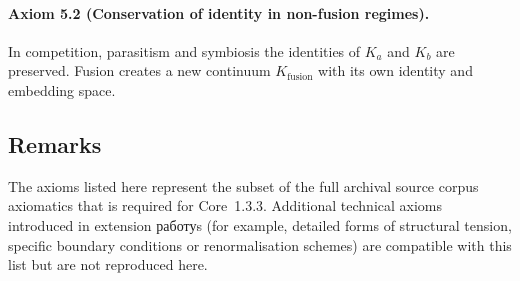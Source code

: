 \paragraph{Axiom 5.2 (Conservation of identity in non-fusion regimes).}
In competition, parasitism and symbiosis the identities of \(K_a\) and \(K_b\)
are preserved.  Fusion creates a new continuum \(K_{\mathrm{fusion}}\) with its
own identity and embedding space.

\subsection{Remarks}

The axioms listed here represent the subset of the full archival source corpus axiomatics
that is required for Core~1.3.3.  Additional technical axioms introduced in
extension работуs (for example, detailed forms of structural tension, specific
boundary conditions or renormalisation schemes) are compatible with this list
but are not reproduced here.
